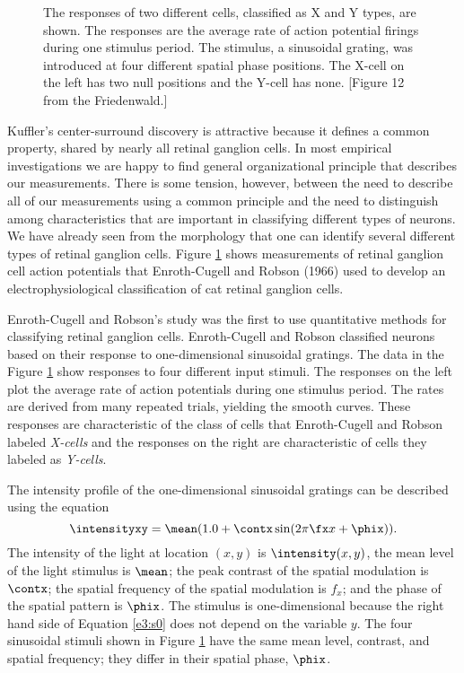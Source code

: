 \begin{figure}
\centerline {
}
\caption[Classification into X and Y types]{
The responses of two different cells, classified as X and Y types,
are shown.
The responses are the average rate of action potential
firings during one stimulus period.
The stimulus, a sinusoidal grating, was introduced at four
different spatial phase positions.
The X-cell on the left has two null positions and the Y-cell has none.
[Figure 12 from the Friedenwald.]
}
\label{f4:XY.null}
\end{figure}
Kuffler's center-surround discovery
is attractive because it defines
a common property, shared by nearly all retinal ganglion cells.
In most empirical investigations we are happy
to find general organizational
principle that describes our measurements.
There is some tension, however, between the need
to describe all of our measurements using a common
principle and the need to distinguish among
characteristics that are important in
classifying different types of neurons.
We have already seen from the morphology that one can
identify several different types of retinal ganglion cells.
Figure \ref{f4:XY.null}
shows measurements of retinal ganglion cell action potentials
that Enroth-Cugell and Robson (1966) used
to develop an electrophysiological classification of
cat retinal ganglion cells.

Enroth-Cugell and Robson's study was
the first to
use quantitative methods for classifying retinal ganglion cells.
Enroth-Cugell and Robson classified neurons based on their
response to one-dimensional sinusoidal gratings.
The data in the Figure \ref{f4:XY.null} show
responses to four different input stimuli.
The responses on the left plot the average rate
of action potentials during one stimulus period.
The rates are derived from many repeated
trials, yielding the smooth curves.
These responses are characteristic of
the class of cells that Enroth-Cugell and Robson
labeled {\em X-cells}
and the responses on the right are characteristic of 
cells they labeled as {\em Y-cells}.

The intensity profile of the one-dimensional
sinusoidal gratings can be described using
the equation
\begin{equation}
\label{e3:s0}
\intensityxy = \mean ( 1.0 + \contx \sin ( 2 \pi \fx x + \phix ) ) .
\end{equation}
The intensity of the light
at location $(x,y)$ is $\intensity (x,y) $,
the mean level of the light stimulus is $\mean$;
the peak contrast of the spatial modulation is $\contx$;
the spatial frequency of the spatial modulation is $f_x$;
and the phase of the spatial pattern is $\phix$.
The stimulus is one-dimensional because the right hand side
of Equation \ref{e3:s0} does not depend on the variable $y$.
The four sinusoidal stimuli shown in
Figure \ref{f4:XY.null} have the same mean level,
contrast, and spatial frequency;
they differ in their spatial phase, $\phix$.

